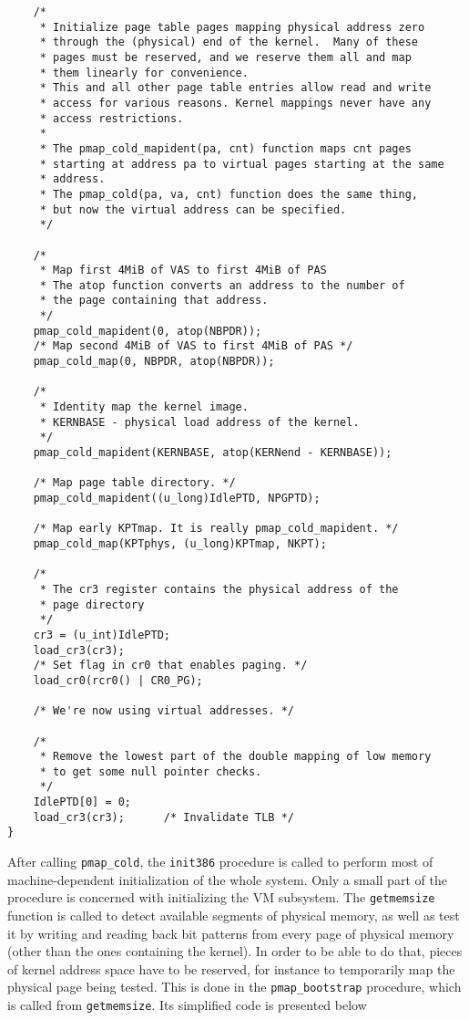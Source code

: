 \documentclass[shortabstract, english]{iithesis}
\newenvironment{code}{}{}
\begin{document}
\begin{code}
\begin{verbatim}
    /*
     * Initialize page table pages mapping physical address zero
     * through the (physical) end of the kernel.  Many of these
     * pages must be reserved, and we reserve them all and map
     * them linearly for convenience.
     * This and all other page table entries allow read and write
     * access for various reasons. Kernel mappings never have any
     * access restrictions.
     *
     * The pmap_cold_mapident(pa, cnt) function maps cnt pages
     * starting at address pa to virtual pages starting at the same
     * address.
     * The pmap_cold(pa, va, cnt) function does the same thing,
     * but now the virtual address can be specified.
     */

    /*
     * Map first 4MiB of VAS to first 4MiB of PAS
     * The atop function converts an address to the number of
     * the page containing that address.
     */
    pmap_cold_mapident(0, atop(NBPDR));
    /* Map second 4MiB of VAS to first 4MiB of PAS */
    pmap_cold_map(0, NBPDR, atop(NBPDR));

    /*
     * Identity map the kernel image.
     * KERNBASE - physical load address of the kernel.
     */
    pmap_cold_mapident(KERNBASE, atop(KERNend - KERNBASE));

    /* Map page table directory. */
    pmap_cold_mapident((u_long)IdlePTD, NPGPTD);

    /* Map early KPTmap. It is really pmap_cold_mapident. */
    pmap_cold_map(KPTphys, (u_long)KPTmap, NKPT);

    /*
     * The cr3 register contains the physical address of the
     * page directory
     */
    cr3 = (u_int)IdlePTD;
    load_cr3(cr3);
    /* Set flag in cr0 that enables paging. */
    load_cr0(rcr0() | CR0_PG);

    /* We're now using virtual addresses. */

    /*
     * Remove the lowest part of the double mapping of low memory
     * to get some null pointer checks.
     */
    IdlePTD[0] = 0;
    load_cr3(cr3);      /* Invalidate TLB */
}
\end{verbatim}
\end{code}

After calling \texttt{pmap_cold}, the \texttt{init386} procedure is
called to perform most of machine-dependent initialization of the whole system.
Only a small part of the procedure is concerned with initializing the VM
subsystem. The \texttt{getmemsize} function is called to detect available
segments of physical memory, as well as test it by writing and reading back bit
patterns from every page of physical memory (other than the ones containing the kernel).
In order to be able to do that, pieces of kernel address space have to be
reserved, for instance to temporarily map the physical page being tested.
This is done in the \texttt{pmap_bootstrap} procedure, which is called
from \texttt{getmemsize}. Its simplified code is presented below
\end{document}
